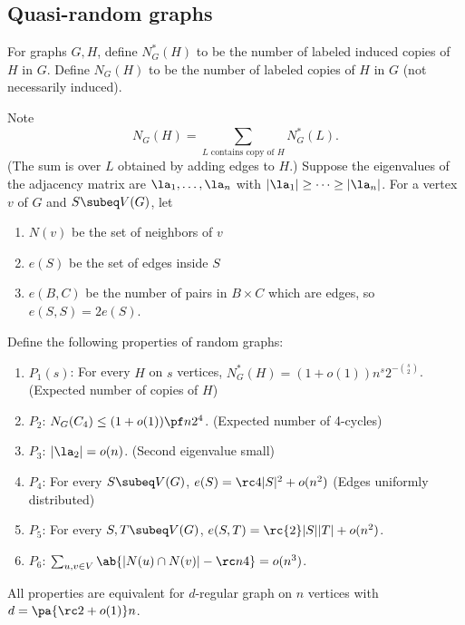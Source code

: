 
\subsection{Quasi-random graphs}
\begin{df}
For graphs $G, H$, define $N_G^*(H)$ to be the number of labeled induced copies of $H$ in $G$. Define $N_G(H)$ to be the number of labeled copies of $H$ in $G$ (not necessarily induced).
\end{df}
Note
\[
N_G(H)=\sum_{L\text{ contains copy of }H} N_G^*(L).
\]
(The sum is over $L$ obtained by adding edges to $H$.)
Suppose the eigenvalues of the adjacency matrix are $\la_1,\ldots, \la_n$ with $|\la_1|\ge\cdots\ge|\la_n|$. For a vertex $v$ of $G$ and $S\subeq V(G)$, let
\begin{enumerate}
\item
$N(v)$ be the set of neighbors of $v$
\item $e(S)$ be the set of edges inside $S$
\item $e(B,C)$ be the number of pairs in $B\times C$ which are edges, so $e(S,S)=2e(S)$.
\end{enumerate}
\begin{df}
Define the following properties of random graphs:
\begin{enumerate}
\item $P_1(s)$: For every $H$ on $s$ vertices, $N^*_G(H)=(1+o(1))n^s 2^{-\binom s2}$. (Expected number of copies of $H$)%
\item $P_2$: $N_G(C_4)\le (1+o(1))\pf n2^4$. (Expected number of 4-cycles)
\item $P_3$: $|\la_2|=o(n)$. (Second eigenvalue small)
\item $P_4$: For every $S\subeq V(G)$, $e(S)=\rc 4|S|^2+o(n^2)$
(Edges uniformly distributed)
\item $P_5$: For every $S,T\subeq V(G)$, $e(S,T)=\rc{2}|S||T|+o(n^2)$.
\item $P_6$: $\sum_{u,v\in V}\ab{|N(u)\cap N(v)|-\rc n4}=o(n^3)$.
\end{enumerate}
\end{df}
\begin{thm}
All properties are equivalent for $d$-regular graph on $n$ vertices with $d=\pa{\rc 2+o(1)}n$.
\end{thm}
